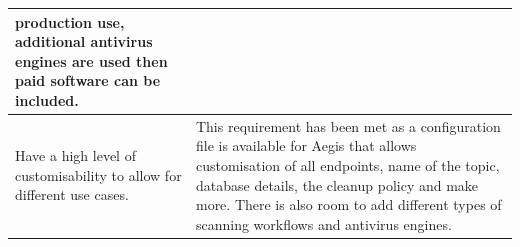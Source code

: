 \documentclass[12pt, conference, final, a4paper, onecolumn, compsoc]{IEEEtran}
\begin{document}
\begin{table}[H]
\begin{tabular}{|p{}|p{}|}
                                                                    production
                                                                    use,
                                                                    additional
                                                                    antivirus
                                                                    engines are
                                                                    used then
                                                                    paid
                                                                    software can
                                                                    be included.
    \\ \hline

    \hline

    Have a high level of customisability to allow for different use cases. &
                                                                             This
                                                                             requirement
    has been met as a configuration file is available for Aegis that allows
                                                                             customisation
                                                                             of
                                                                             all
    endpoints, name of the topic, database details, the cleanup policy and make
                                                                             more.
                                                                             There
                                                                             is
                                                                             also
                                                                             room
                                                                             to
                                                                             add
                                                                             different
                                                                             types
                                                                             of
                                                                             scanning
                                                                             workflows
                                                                             and
                                                                             antivirus engines.

\end{tabular}
\end{table}
\end{document}
